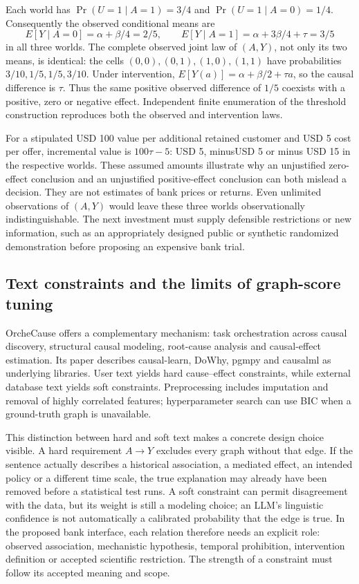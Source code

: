 Each world has $\Pr(U=1\mid A=1)=3/4$ and
$\Pr(U=1\mid A=0)=1/4$. Consequently the observed conditional means are
\begin{equation}
 E[Y\mid A=0]=\alpha+\beta/4=2/5,\qquad
 E[Y\mid A=1]=\alpha+3\beta/4+\tau=3/5
 \label{exec17:frontier-observed}
\end{equation}
in all three worlds. The complete observed joint law of $(A,Y)$, not only
its two means, is identical: the cells $(0,0),(0,1),(1,0),(1,1)$ have
probabilities $3/10,1/5,1/5,3/10$. Under intervention,
$E[Y(a)]=\alpha+\beta/2+\tau a$, so the causal difference is $\tau$.
Thus the same positive observed difference of $1/5$ coexists with a
positive, zero or negative effect. Independent finite enumeration of the
threshold construction reproduces both the observed and intervention laws.
\citep{exec17_frontier_exact}

For a stipulated USD 100 value per additional retained customer and USD 5
cost per offer, incremental value is $100\tau-5$: USD 5, minusUSD 5 or
minus USD 15 in the respective worlds. These assumed amounts illustrate why
an unjustified zero-effect conclusion and an unjustified positive-effect
conclusion can both mislead a decision. They are not estimates of bank prices
or returns. Even unlimited observations of $(A,Y)$ would leave these three
worlds observationally indistinguishable. The next investment must supply
defensible restrictions or new information, such as an appropriately designed
public or synthetic randomized demonstration before proposing an expensive
bank trial.\citep{exec17_frontier_exact}

\subsection{Text constraints and the limits of graph-score tuning}

OrcheCause offers a complementary mechanism: task orchestration across causal
discovery, structural causal modeling, root-cause analysis and causal-effect
estimation. Its paper describes causal-learn, DoWhy, pgmpy and causalml as
underlying libraries. User text yields hard cause--effect constraints, while
external database text yields soft constraints. Preprocessing includes
imputation and removal of highly correlated features; hyperparameter search
can use BIC when a ground-truth graph is unavailable.
\citep{exec17_frontier_yang}

This distinction between hard and soft text makes a concrete design choice
visible. A hard requirement $A\to Y$ excludes every graph without that edge.
If the sentence actually describes a historical association, a mediated
effect, an intended policy or a different time scale, the true explanation
may already have been removed before a statistical test runs. A soft
constraint can permit disagreement with the data, but its weight is still
a modeling choice; an LLM's linguistic confidence is not automatically a
calibrated probability that the edge is true. In the proposed bank interface,
each relation therefore needs an explicit role: observed association,
mechanistic hypothesis, temporal prohibition, intervention definition or
accepted scientific restriction. The strength of a constraint must follow
its accepted meaning and scope.

